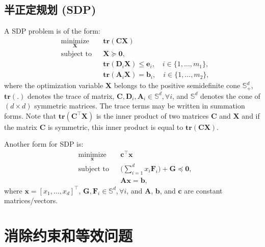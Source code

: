 \documentclass[lang=cn,10pt]{gorgeousnbook}
\numberwithin{equation}{section}%
\numberwithin{figure}{section}%
\begin{document}
\subsection{半正定规划 (SDP)}

A SDP problem is of the form:
\begin{equation}
\begin{aligned}
& \underset{\boldsymbol{X}}{\text{minimize}}
& & \textbf{tr}(\boldsymbol{C} \boldsymbol{X}) \\
& \text{subject to}
& & \boldsymbol{X} \succeq \boldsymbol{0}, \\
& & & \textbf{tr}(\boldsymbol{D}_i \boldsymbol{X}) \leq \boldsymbol{e}_i, \quad i \in \{1, \dots, m_1\}, \\
& & & \textbf{tr}(\boldsymbol{A}_i \boldsymbol{X}) = \boldsymbol{b}_i, \quad i \in \{1, \dots, m_2\}, 
\end{aligned}
\end{equation}
where the optimization variable $\boldsymbol{X}$ belongs to the positive semidefinite cone $\mathbb{S}_+^d$, $\textbf{tr}(.)$ denotes the trace of matrix, $\boldsymbol{C}, \boldsymbol{D}_i, \boldsymbol{A}_i \in \mathbb{S}^d, \forall i$, and $\mathbb{S}^d$ denotes the cone of $(d \times d)$ symmetric matrices. 
The trace terms may be written in summation forms.
Note that $\textbf{tr}(\boldsymbol{C}^\top \boldsymbol{X})$ is the inner product of two matrices $\boldsymbol{C}$ and $\boldsymbol{X}$ and if the matrix $\boldsymbol{C}$ is symmetric, this inner product is equal to $\textbf{tr}(\boldsymbol{C} \boldsymbol{X})$.  

Another form for SDP is: 
\begin{equation}
\begin{aligned}
& \underset{\boldsymbol{x}}{\text{minimize}}
& & \boldsymbol{c}^\top \boldsymbol{x} \\
& \text{subject to}
& & \Big(\sum_{i=1}^d x_i \boldsymbol{F}_i\Big) + \boldsymbol{G} \preceq \boldsymbol{0}, \\
& & & \boldsymbol{Ax} = \boldsymbol{b},
\end{aligned}
\end{equation}
where $\boldsymbol{x} = [x_1, \dots, x_d]^\top$, $\boldsymbol{G}, \boldsymbol{F}_i \in \mathbb{S}^d, \forall i$, and $\boldsymbol{A}$, $\boldsymbol{b}$, and $\boldsymbol{c}$ are constant matrices/vectors.

\section{消除约束和等效问题}
\end{document}
